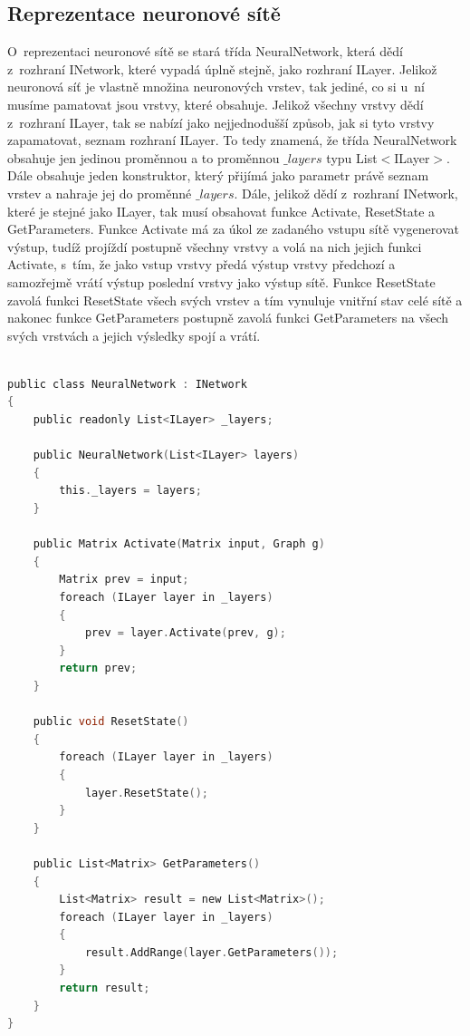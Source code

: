 \documentclass[a4paper]{article}
\begin{document}
\subsection{Reprezentace neuronové sítě}
O~reprezentaci neuronové sítě se stará třída NeuralNetwork, která dědí z~rozhraní INetwork, které vypadá úplně stejně, jako rozhraní ILayer. Jelikož neuronová síť je vlastně množina neuronových vrstev, tak jediné, co si u~ní musíme pamatovat jsou vrstvy, které obsahuje. Jelikož všechny  vrstvy dědí z~rozhraní ILayer, tak se nabízí jako nejjednodušší způsob, jak si tyto vrstvy zapamatovat, seznam rozhraní ILayer. To tedy znamená, že třída NeuralNetwork obsahuje jen jedinou proměnnou a to proměnnou $\_layers$ typu List$<$ILayer$>$. Dále obsahuje jeden konstruktor, který přijímá jako parametr právě seznam vrstev a nahraje jej do proměnné $\_layers$. Dále, jelikož dědí z~rozhraní INetwork, které je stejné jako ILayer, tak musí obsahovat funkce Activate, ResetState a GetParameters. Funkce Activate má za úkol ze zadaného vstupu sítě vygenerovat výstup, tudíž projíždí postupně všechny vrstvy a volá na nich jejich funkci Activate, s~tím, že jako vstup vrstvy předá výstup  vrstvy předchozí a samozřejmě vrátí výstup poslední vrstvy jako výstup sítě. Funkce ResetState zavolá funkci ResetState všech svých vrstev a tím vynuluje vnitřní stav celé sítě a nakonec funkce GetParameters postupně zavolá funkci GetParameters na všech svých vrstvách a jejich výsledky spojí a vrátí.
\begin{lstlisting}[language=C, title={Ukázka třídy NeuralNetwork}]

public class NeuralNetwork : INetwork
{  
    public readonly List<ILayer> _layers;

    public NeuralNetwork(List<ILayer> layers)
    {
        this._layers = layers;
    }

    public Matrix Activate(Matrix input, Graph g)
    {
        Matrix prev = input;
        foreach (ILayer layer in _layers)
        {
            prev = layer.Activate(prev, g);
        }
        return prev;
    }

    public void ResetState()
    {
        foreach (ILayer layer in _layers)
        {
            layer.ResetState();
        }
    }

    public List<Matrix> GetParameters()
    {
        List<Matrix> result = new List<Matrix>();
        foreach (ILayer layer in _layers)
        {
            result.AddRange(layer.GetParameters());
        }
        return result;
    }
}
\end{lstlisting}
\end{document}
